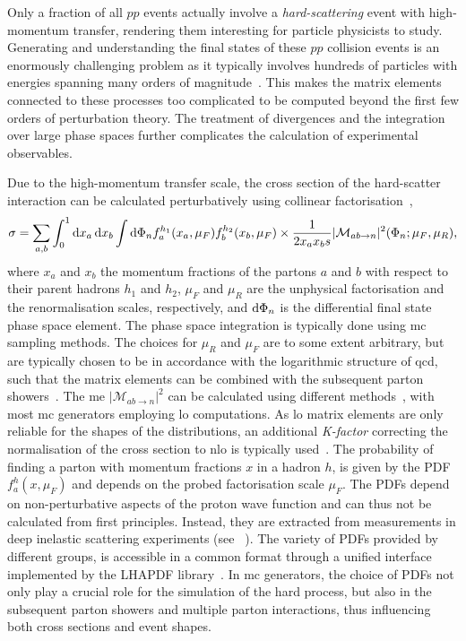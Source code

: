 
Only a fraction of all $pp$ events actually involve a \textit{hard-scattering} event with high-momentum transfer, rendering them interesting for particle physicists to study. Generating and understanding the final states of these $pp$ collision events is an enormously challenging problem as it typically involves hundreds of particles with energies spanning many orders of magnitude~\cite{Buckley:2011ms}. This makes the matrix elements connected to these processes too complicated to be computed beyond the first few orders of perturbation theory. The treatment of divergences and the integration over large phase spaces further complicates the calculation of experimental observables.

Due to the high-momentum transfer scale, the cross section of the hard-scatter interaction can be calculated perturbatively using collinear factorisation~\cite{Buckley:2011ms},
\begin{equation}
	\sigma = \sum_{a,b}{\int_0^1{\mathop{}\!\mathrm{d} x_a \mathop{}\!\mathrm{d} x_b\int{\mathop{}\!\mathrm{d}\Phi_n f_a^{h_1}(x_a,\mu_F) f_b^{h_2}(x_b,\mu_F)} \times \frac{1}{2 x_a x_b s}\vert \mathcal{M}_{ab\rightarrow n} \vert^2 (\Phi_n; \mu_F,\mu_R)}},
\end{equation}
where $x_a$ and $x_b$ the momentum fractions of the partons $a$ and $b$ with respect to their parent hadrons $h_1$ and $h_2$, $\mu_F$ and $\mu_R$ are the unphysical factorisation and the renormalisation scales, respectively, and $\mathop{}\!\mathrm{d}\Phi_n$ is the differential final state phase space element. The phase space integration is typically done using \gls{mc} sampling methods. The choices for $\mu_R$ and $\mu_F$ are to some extent arbitrary, but are typically chosen to be in accordance with the logarithmic structure of \gls{qcd}, such that the matrix elements can be combined with the subsequent parton showers~\cite{Buckley:2011ms}. The \gls{me} $\vert\mathcal{M}_{ab\rightarrow n}\vert^2$ can be calculated using different methods~\cite{Buckley:2011ms}, with most \gls{mc} generators employing \gls{lo} computations. As \gls{lo} matrix elements are only reliable for the shapes of the distributions, an additional \textit{K-factor} correcting the normalisation of the cross section to \gls{nlo} is typically used~\cite{Buckley:2011ms}. The probability of finding a parton with momentum fractions $x$ in a hadron $h$, is given by the \gls{PDF} $f_a^{h}(x,\mu_F)$ and depends on the probed factorisation scale $\mu_F$. The \glspl{PDF} depend on non-perturbative aspects of the proton wave function and can thus not be calculated from first principles. Instead, they are extracted from measurements in deep inelastic scattering experiments (see \eg~\cite{Gribov:1972ri, Blumlein:1996wj}). The variety of \glspl{PDF} provided by different groups, is accessible in a common format through a unified interface implemented by the LHAPDF library~\cite{Buckley:2014ana}. In \gls{mc} generators, the choice of \glspl{PDF} not only play a crucial role for the simulation of the hard process, but also in the subsequent parton showers and multiple parton interactions, thus influencing both cross sections and event shapes.

